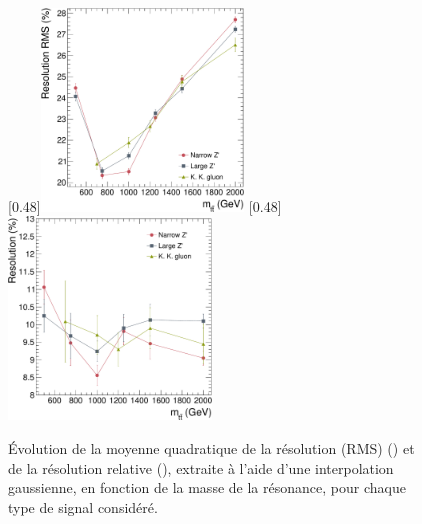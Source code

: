 \begin{figure}[tbp] \centering
    \subcaptionbox{\label{fig:rms_zprime}}[0.48\textwidth]{\includegraphics[width=0.48\textwidth]{chapitre7/figs/signal_rms_vs_mtt.pdf}} \hfill
    \subcaptionbox{\label{fig:reso_zprime}}[0.48\textwidth]{\includegraphics[width=0.48\textwidth]{chapitre7/figs/signal_reso_vs_mtt.pdf}}
    \caption{Évolution de la moyenne quadratique de la résolution (RMS) () et de la résolution relative (), extraite à l'aide d'une interpolation gaussienne, en fonction de la masse de la résonance, pour chaque type de signal considéré.}
    \label{fig:rms_reso_zprime}
\end{figure}

